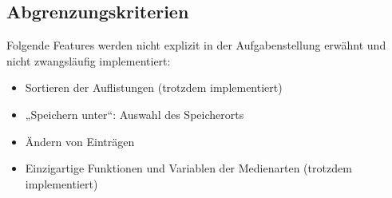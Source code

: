\subsection*{Abgrenzungskriterien}
Folgende Features werden nicht explizit in der Aufgabenstellung erwähnt und nicht zwangsläufig implementiert:
\begin{itemize}
\item Sortieren der Auflistungen (trotzdem implementiert)
\item „Speichern unter“: Auswahl des Speicherorts
\item Ändern von Einträgen
\item Einzigartige Funktionen und Variablen der Medienarten (trotzdem implementiert)
\end{itemize}

